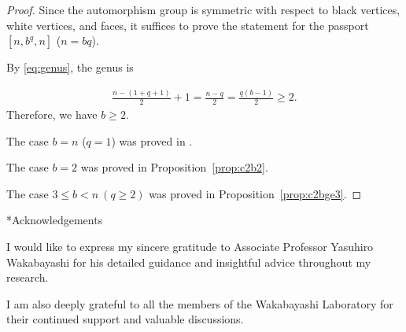 \documentclass[12pt,reqno]{amsart}
\makeatletter
\newif\if@noindentafterheading
\renewcommand\subsection{\@startsection{subsection}{2}{\z@}%
  {-2.5ex \@plus -.3ex \@minus -.2ex}%
  {1.5ex \@plus .2ex}%
  {\normalfont\bfseries}%
}
\let\orig@subsection\subsection
\renewcommand\subsection{%
  \@ifstar{\subsection@star}{\subsection@nostar}%
}
\newcommand\subsection@nostar{%
  \@ifnextchar[{\subsection@opt}{\subsection@noopt}%
}
\newcommand\subsection@opt[2][]{%
  \global\@noindentafterheadingtrue
  \orig@subsection[#1]{#2}%
  \global\@noindentafterheadingfalse
}
\newcommand\subsection@noopt[1]{%
  \global\@noindentafterheadingtrue
  \orig@subsection{#1}%
  \global\@noindentafterheadingfalse
}
\newcommand\subsection@star[1]{%
  \global\@noindentafterheadingtrue
  \orig@subsection*{#1}%
  \global\@noindentafterheadingfalse
}
\newcommand{\f}[2]{\frac{#1}{#2}}							%
\theoremstyle{mythmstyle}
\theoremstyle{mydefstyle}
\newcommand{\propref}[1]{Proposition~\ref{#1}}
\numberwithin{equation}{section}
\makeatother
\begin{document}
\begin{proof}
Since the automorphism group is symmetric with respect to black vertices, white vertices, and faces,
it suffices to prove the statement for the passport $[n, b^{q}, n]$ ($n = bq$).

By \eqref{eq:genus}, the genus is

\begin{align}
\f{n - (1 + q + 1)}{2} + 1 = \f{n - q}{2} = \f{q(b-1)}{2} \ge 2.
\end{align}
Therefore, we have $b \ge 2$.

The case $b = n$ ($q = 1$) was proved in \cite[Proposition~7.1]{Ohnishi26}.

The case $b = 2$ was proved in \propref{prop:c2b2}.

The case $3 \le b < n \ (q \ge 2)$ was proved in \propref{prop:c2bge3}.
\end{proof}

\FloatBarrier
\subsection*{Acknowledgements}

I would like to express my sincere gratitude to Associate Professor Yasuhiro Wakabayashi for his detailed guidance
and insightful advice throughout my research.

I am also deeply grateful to all the members of the Wakabayashi Laboratory for their continued support and
valuable discussions.

\vspace{-.5\baselineskip}



\end{document}
